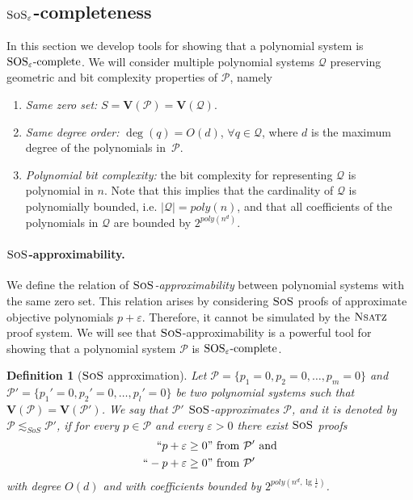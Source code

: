 \documentclass[11pt]{article}
\newcommand{\sos}{\text{\sc{SoS}}}
\newcommand{\Nsatz}{\textsc{Nsatz}}
\newcommand{\Variety}[1]{{\textbf{V}}\left( #1 \right)}
\newcommand{\1}{\textbf{1}}
\newtheorem{definition}[theorem]{Definition}
\newcommand{\SOSe}{\rm{SOS}_\varepsilon\text{-complete}}
\begin{document}
\subsection[SoS epsilon completeness]{$\sos_\varepsilon$-completeness}\label{sect:SOS_completeness}
In this section we develop tools for showing that a polynomial system is $\SOSe$.
We will consider multiple polynomial systems $\mathcal{Q}$ preserving geometric and bit complexity properties of $\mathcal{P}$, namely
\begin{enumerate}[label=A\arabic*.]
    \item \label{assumption_1} \textit{Same zero set:} $S = \Variety{\mathcal{P}} = \Variety{\mathcal{Q}}$.
    \item \label{assumption_2} \textit{Same degree order:} $\deg(q) = O(d)$, $ \forall q \in \mathcal{Q}$, where $d$ is the maximum degree of the polynomials in~$\mathcal{P}$.
    \item \label{assumption_3} \textit{Polynomial bit complexity:} the bit complexity for representing $\mathcal{Q}$ is polynomial in $n$. Note that this implies that the cardinality of $\mathcal{Q}$ is polynomially bounded, i.e. $|\mathcal{Q}| = poly(n)$, and that all coefficients of the polynomials in $\mathcal{Q}$ are bounded by $2^{poly(n^d)}$.
\end{enumerate}
\paragraph{$\sos$-approximability.}
We define the relation of \emph{$\sos$-approximability} between polynomial systems with the same zero set. This relation arises by considering $\sos$ proofs of approximate objective polynomials $p + \varepsilon$. Therefore, it cannot be simulated by the $\Nsatz$ proof system. We will see that $\sos$-approximability is a powerful tool for showing that a polynomial system $\mathcal{P}$ is $\SOSe$.
\begin{definition}[$\sos$ approximation]\label{def:sos_approx}
     Let $\mathcal{P}=\{p_1 = 0,p_2=0, \dots, p_m=0\}$ and $\mathcal{P}'=\{p_1'=0, p_2'=0, \dots, p_l'=0\}$ be two polynomial systems such that $\Variety{\mathcal{P}} = \Variety{\mathcal{P}'}$. We say that \emph{$\mathcal{P}'$ $\sos$-approximates $\mathcal{P}$}, and it is denoted by $\mathcal{P} \lesssim_{SoS} \mathcal{P}'$, if for every $p \in \mathcal{P}$ and every $\varepsilon >0$ there exist $\sos$ proofs
    \begin{align}
      \begin{split}
    ``p + \varepsilon \geq 0&"  \text{ from }\mathcal{P}' \text{ and}\\
    ``-p + \varepsilon \geq 0&" \text{ from } \mathcal{P}'     
      \end{split}
    \end{align} 
    with degree $O(d)$ and with coefficients bounded by $2^{poly(n^d, \lg \frac{1}{\varepsilon})}$.
\end{definition}
\end{document}
